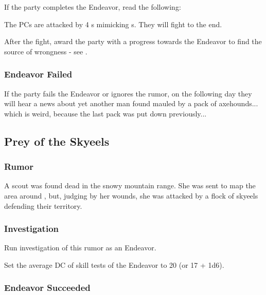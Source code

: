 If the party completes the Endeavor, read the following:


The PCs are attacked by 4 \enemyMidnightBeast{}s mimicking \enemyAxehound{}s. They will fight to the end.

After the fight, award the party with a progress towards the Endeavor to find the source of \locationUrithiru{} wrongness - see .

\subsubsection{Endeavor Failed}

If the party fails the Endeavor or ignores the rumor, on the following day they will hear a news about yet another man found mauled by a pack of axehounds... which is weird, because the last pack was put down previously...




\subsection{Prey of the Skyeels}

\subsubsection{Rumor}

A scout was found dead in the snowy mountain range. She was sent to map the area around \locationUrithiru{}, but, judging by her wounds, she was attacked by a flock of skyeels defending their territory.

\subsubsection{Investigation}

Run investigation of this rumor as an Endeavor. 

Set the average DC of skill tests of the Endeavor to 20 (or 17 + 1d6).

\subsubsection{Endeavor Succeeded}

